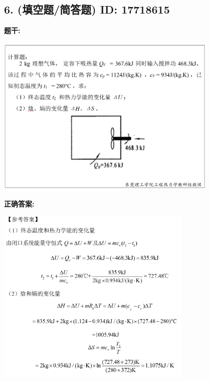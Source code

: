 \documentclass[12pt]{article}
\begin{document}
\subsection*{6. (填空题/简答题) \small ID: 17718615}

\textbf{题干:}


\begin{center}\includegraphics[width=0.8\textwidth, height=0.25\textheight, keepaspectratio]{question_6_17718615/title_img_1.png}\end{center}

\textbf{正确答案:}

\begin{center}\includegraphics[width=0.7\textwidth, height=0.2\textheight, keepaspectratio]{question_6_17718615/correct_answer_1_img_1.png}\end{center}

\vspace{0.5em}\hrulefill\vspace{1em}
\end{document}
